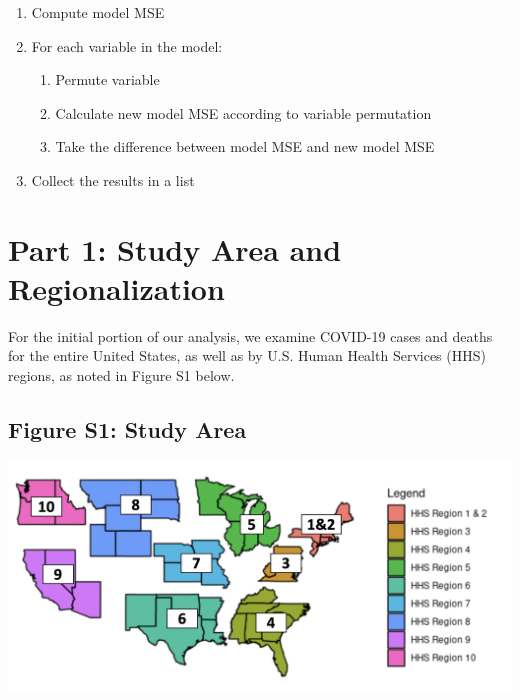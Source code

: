 \documentclass[
]{article}
\providecommand{\tightlist}{%
  \setlength{\itemsep}{0pt}\setlength{\parskip}{0pt}}
\begin{document}
\begin{enumerate}
\def\labelenumi{\arabic{enumi}.}
\tightlist
\item
  Compute model MSE
\item
  For each variable in the model:

  \begin{enumerate}
  \def\labelenumii{\alph{enumii}.}
  \tightlist
  \item
    Permute variable
  \item
    Calculate new model MSE according to variable permutation
  \item
    Take the difference between model MSE and new model MSE
  \end{enumerate}
\item
  Collect the results in a list
\end{enumerate}

\newpage

\hypertarget{part-1-study-area-and-regionalization-1}{%
\section{Part 1: Study Area and
Regionalization}\label{part-1-study-area-and-regionalization-1}}

For the initial portion of our analysis, we examine COVID-19 cases and
deaths for the entire United States, as well as by U.S. Human Health
Services (HHS) regions, as noted in Figure S1 below.

\hypertarget{figure-s1-study-area}{%
\subsection{Figure S1: Study Area}\label{figure-s1-study-area}}

\includegraphics[width=1\textwidth,height=1\textheight]{../figures/hhs_regions.png}

\newpage
\end{document}
